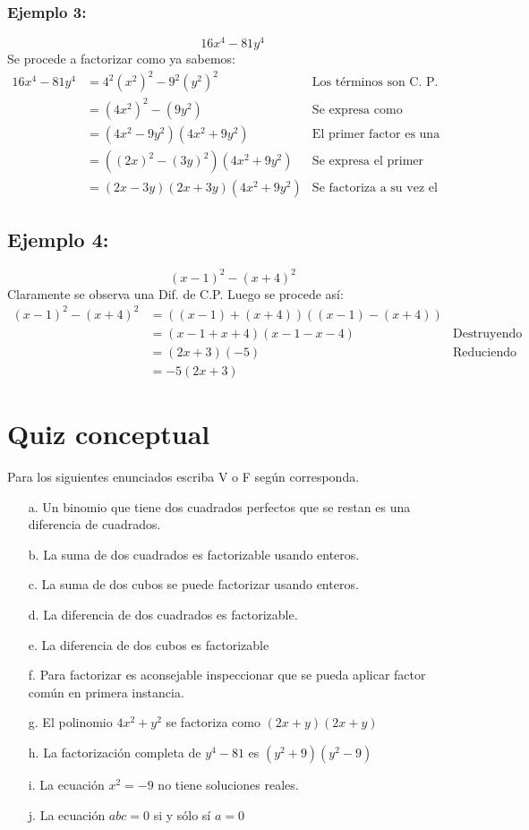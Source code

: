 \documentclass[10pt,twoside]{article}
\begin{document}
\subsubsection*{Ejemplo 3:} 
\[16x^{4}-81y^{4}\]
Se procede a factorizar como ya sabemos:
\begin{align*}
16x^{4}-81y^{4}&=4^{2}(x^{2})^{2}-9^{2}(y^{2})^{2} & \mbox{Los términos son C. P.}\\
&=(4x^{2})^{2}-(9y^{2}) & \mbox{Se expresa como diferencia de C.P.}\\
&=(4x^{2}-9y^{2})(4x^{2}+9y^{2}) & \mbox{El primer factor es una Dif. de C.P.}\\
&=\left((2x)^{2}-(3y)^{2}\right)(4x^{2}+9y^{2}) & \mbox{Se expresa el primer factor como una D. de C.P.}\\
&=(2x-3y)(2x+3y)(4x^{2}+9y^{2}) & \mbox{Se factoriza a su vez el 1er factor}
\end{align*}
\subsection*{Ejemplo 4:}
\[(x-1)^{2}-(x+4)^{2}\]
Claramente se observa una Dif. de C.P. Luego se procede así:
\begin{align*}
(x-1)^{2}-(x+4)^{2}&=((x-1)+(x+4))((x-1)-(x+4))\\
&=(x-1+x+4)(x-1-x-4) & \mbox{Destruyendo los paréntesis internos}\\
&=(2x+3)(-5) & \mbox{Reduciendo términos semejantes}\\
&=-5(2x+3)
\end{align*}

\section*{Quiz conceptual}
Para los siguientes enunciados escriba V o F según corresponda.
\begin{enumerate}
\item[a.] Un binomio que tiene dos cuadrados perfectos que se restan es una diferencia de cuadrados.
\item[b.] La suma de dos cuadrados es factorizable usando enteros.
\item[c.] La suma de dos cubos se puede factorizar usando enteros.
\item[d.] La diferencia de dos cuadrados es factorizable.
\item[e.] La diferencia de dos cubos es factorizable
\item[f.] Para factorizar es aconsejable inspeccionar que se pueda aplicar factor común en primera instancia.
\item[g.] El polinomio $4x^{2}+y^{2}$ se factoriza como $(2x+y)(2x+y)$
\item[h.] La factorización completa de $y^{4}-81$ es $(y^{2}+9)(y^{2}-9)$
\item[i.] La ecuación $x^{2}=-9$ no tiene soluciones reales.
\item[j.] La ecuación $abc=0$ si y sólo sí $a=0$ 
\end{enumerate}
\end{document}
